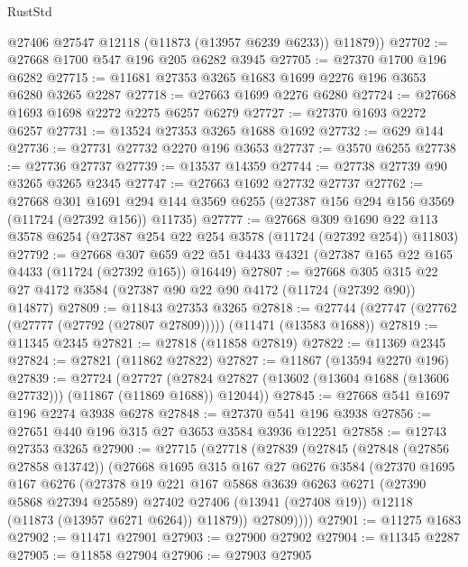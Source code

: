 \begin{lexlean}{RustStd}
\begin{coremodule}
        @27406
        @27547
        @12118
        (@11873 (@13957 @6239 @6233))
        @11879))
@27702 := @27668 @1700 @547 @196 @205 @6282 @3945
@27705 := @27370 @1700 @196 @6282
@27715 := @11681 @27353 @3265 @1683 @1699 @2276 @196 @3653 @6280 @3265 @2287
@27718 := @27663 @1699 @2276 @6280
@27724 := @27668 @1693 @1698 @2272 @2275 @6257 @6279
@27727 := @27370 @1693 @2272 @6257
@27731 := @13524 @27353 @3265 @1688 @1692
@27732 := @629 @144
@27736 := @27731 @27732 @2270 @196 @3653
@27737 := @3570 @6255
@27738 := @27736 @27737
@27739 := @13537 @14359
@27744 := @27738 @27739 @90 @3265 @3265 @2345
@27747 := @27663 @1692 @27732 @27737
@27762 := @27668
    @301
    @1691
    @294
    @144
    @3569
    @6255
    (@27387 @156 @294 @156 @3569 (@11724 (@27392 @156)) @11735)
@27777 := @27668
    @309
    @1690
    @22
    @113
    @3578
    @6254
    (@27387 @254 @22 @254 @3578 (@11724 (@27392 @254)) @11803)
@27792 := @27668
    @307
    @659
    @22
    @51
    @4433
    @4321
    (@27387 @165 @22 @165 @4433 (@11724 (@27392 @165)) @16449)
@27807 := @27668
    @305
    @315
    @22
    @27
    @4172
    @3584
    (@27387 @90 @22 @90 @4172 (@11724 (@27392 @90)) @14877)
@27809 := @11843 @27353 @3265
@27818 := @27744 (@27747 (@27762 (@27777 (@27792 (@27807 @27809))))) (@11471 (@13583 @1688))
@27819 := @11345 @2345
@27821 := @27818 (@11858 @27819)
@27822 := @11369 @2345
@27824 := @27821 (@11862 @27822)
@27827 := @11867 (@13594 @2270 @196)
@27839 := @27724
    (@27727 (@27824 @27827 (@13602 (@13604 @1688 (@13606 @27732))) (@11867 (@11869 @1688)) @12044))
@27845 := @27668 @541 @1697 @196 @2274 @3938 @6278
@27848 := @27370 @541 @196 @3938
@27856 := @27651 @440 @196 @315 @27 @3653 @3584 @3936 @12251
@27858 := @12743 @27353 @3265
@27900 := @27715
    (@27718
      (@27839
        (@27845
          (@27848 (@27856 @27858 @13742))
          (@27668
            @1695
            @315
            @167
            @27
            @6276
            @3584
            (@27370
              @1695
              @167
              @6276
              (@27378
                @19
                @221
                @167
                @5868
                @3639
                @6263
                @6271
                (@27390 @5868 @27394 @25589)
                @27402
                @27406
                (@13941 (@27408 @19))
                @12118
                (@11873 (@13957 @6271 @6264))
                @11879))
            @27809))))
@27901 := @11275 @1683
@27902 := @11471 @27901
@27903 := @27900 @27902
@27904 := @11345 @2287
@27905 := @11858 @27904
@27906 := @27903 @27905

\end{coremodule}
\end{lexlean}
